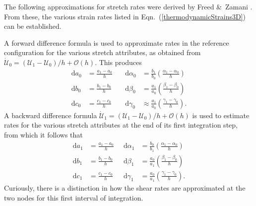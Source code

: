 The following approximations for stretch rates were derived by Freed \&\ Zamani \cite{FreedZamani18}.  From these, the various strain rates listed in Eqn.~(\ref{thermodynamicStrains3D}) can be established.  

A forward difference formula is used to approximate rates in the reference configuration for the various stretch attributes, as obtained from $\dot{\boldsymbol{\mathcal{U}}}_0 = ( \boldsymbol{\mathcal{U}}_1 -  \boldsymbol{\mathcal{U}}_0 ) / h + \mathcal{O}(h)$.  This produces
\begin{equation}
\begin{aligned}
\mathrm{d} a_0 &
= \frac {a_1 - a_0}{h} \quad &
\mathrm{d} \alpha_0 & 
= \frac{b_1}{b_0} \left(\frac{\alpha_1 - \alpha_0}{h} \right) \\
\mathrm{d} b_0 & 
= \frac {b_1 - b_0}{h} \quad & 
\mathrm{d} \beta_0 & 
= \frac{a_1}{a_0} \left( \frac{\beta_1 - \beta_0}{h} \right) \\
\mathrm{d} c_0 & 
= \frac {c_1 - c_0}{h} \quad & 
\mathrm{d} \gamma_0 & \approx \frac{a_1}{a_0} \left( \frac{\gamma_1 - \gamma_0}{h}\right) .
\end{aligned}
\label{forwardDifference1stOrder3D}
\end{equation}
A backward difference formula $\dot{\boldsymbol{\mathcal{U}}}_1 = ( \boldsymbol{\mathcal{U}}_1 -  \boldsymbol{\mathcal{U}}_0 ) / h + \mathcal{O}(h)$ is used to estimate rates for the various stretch attributes at the end of its first integration step, from which it follows that
\begin{equation}
\begin{aligned}
\mathrm{d} a_1 & 
= \frac {a_1 - a_0}{h} \;\; & 
\mathrm{d} \alpha_1 & 
= \frac {b_0}{b_1} \left( \frac{\alpha_1 - \alpha_0}{h} \right) \\
\mathrm{d} b_1 & 
= \frac {b_1 - b_0}{h} \;\; & 
\mathrm{d} \beta_1 & 
= \frac {a_0} {a_1} \left( \frac{\beta_1 - \beta_0}{h} \right) \\
\mathrm{d} c_1 & 
= \frac {c_1 - c_0}{h} \;\; & 
\mathrm{d} \gamma_1 & 
= \frac{a_0}{a_1} \left(\frac{\gamma_1 - \gamma_0}{h} \right) .
\end{aligned}
\label{backwardDifference1stOrder3D}
\end{equation}
Curiously, there is a distinction in how the shear rates are approximated at the two nodes for this first interval of integration.


